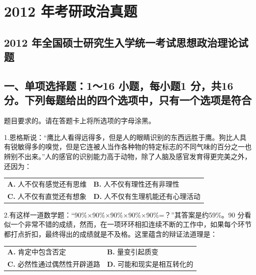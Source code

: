 \documentclass[UTF8,11pt]{ctexart}
\begin{document}
\section*{2012 年考研政治真题}
\subsection*{2012 年全国硕士研究生入学统一考试思想政治理论试题}

\subsection*{一、单项选择题：1～16 小题，每小题1 分，共16 分。下列每题给出的四个选项中，只有一个选项是符合}

题目要求的。请在答题卡上将所选项的字母涂黑。


1.恩格斯说：“鹰比人看得远得多，但是人的眼睛识别的东西远胜于鹰。狗比人具有锐敏得多的嗅觉，但是它连被人当作各种物的特定标志的不同气味的百分之一也辨别不出来。”人的感官的识别能力高于动物，除了人脑及感官发育得更完美之外，还因为：


\begin{center}\begin{tabular}{>{\raggedright\arraybackslash}p{\dimexpr(\linewidth-4\tabcolsep)/2\relax}>{\raggedright\arraybackslash}p{\dimexpr(\linewidth-4\tabcolsep)/2\relax}}
\textbf{A.} 人不仅有感觉还有思维 & \textbf{B.} 人不仅有理性还有非理性\\[.35em]
\textbf{C.} 人不仅有直觉还有想象 & \textbf{D.} 人不仅有生理机能还有心理活动\\[.35em]\end{tabular}\end{center}

2.有这样一道数学题：“90\%×90\%×90\%×90\%×90\%=？”其答案是约59\%。90 分看似一个非常不错的成绩，然而，在一项环环相扣连续不断的工作中，如果每个环节都打点折扣，最终得出的成绩就是不及格。这里蕴含的辩证法道理是：


\begin{center}\begin{tabular}{>{\raggedright\arraybackslash}p{\dimexpr(\linewidth-4\tabcolsep)/2\relax}>{\raggedright\arraybackslash}p{\dimexpr(\linewidth-4\tabcolsep)/2\relax}}
\textbf{A.} 肯定中包含否定 & \textbf{B.} 量变引起质变\\[.35em]
\textbf{C.} 必然性通过偶然性开辟道路 & \textbf{D.} 可能和现实是相互转化的\\[.35em]\end{tabular}\end{center}
\end{document}
